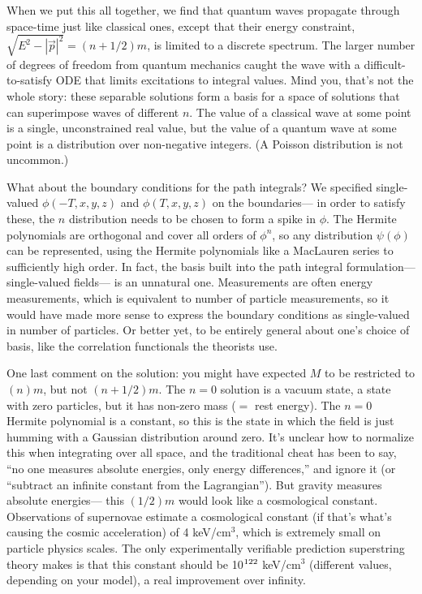 \documentclass[12pt]{article}
\begin{document}
When we put this all together, we find that quantum waves propagate
through space-time just like classical ones, except that their energy
constraint, $\sqrt{E^2 - |\vec{p}|^2} = (n + 1/2) m$, is limited to a
discrete spectrum.  The larger number of degrees of freedom from
quantum mechanics caught the wave with a difficult-to-satisfy ODE that
limits excitations to integral values.  Mind you, that's not the whole
story: these separable solutions form a basis for a space of solutions
that can superimpose waves of different $n$.  The value of a classical
wave at some point is a single, unconstrained real value, but the
value of a quantum wave at some point is a distribution over
non-negative integers.  (A Poisson distribution is not uncommon.)

What about the boundary conditions for the path integrals?  We
specified single-valued $\phi(-T, x, y, z)$ and $\phi(T, x, y, z)$ on
the boundaries--- in order to satisfy these, the $n$ distribution
needs to be chosen to form a spike in $\phi$.  The Hermite polynomials
are orthogonal and cover all orders of $\phi^n$, so any distribution
$\psi(\phi)$ can be represented, using the Hermite polynomials like a
MacLauren series to sufficiently high order.  In fact, the basis built
into the path integral formulation--- single-valued fields--- is an
unnatural one.  Measurements are often energy measurements, which is
equivalent to number of particle measurements, so it would have made
more sense to express the boundary conditions as single-valued in
number of particles.  Or better yet, to be entirely general about
one's choice of basis, like the correlation functionals the theorists
use.

One last comment on the solution: you might have expected $M$ to be
restricted to $(n)m$, but not $(n + 1/2)m$.  The $n = 0$ solution is a
vacuum state, a state with zero particles, but it has non-zero mass
($=$ rest energy).  The $n=0$ Hermite polynomial is a constant, so
this is the state in which the field is just humming with a Gaussian
distribution around zero.  It's unclear how to normalize this when
integrating over all space, and the traditional cheat has been to say,
``no one measures absolute energies, only energy differences,'' and
ignore it (or ``subtract an infinite constant from the Lagrangian'').
But gravity measures absolute energies--- this $(1/2) m$ would look
like a cosmological constant.  Observations of supernovae estimate a
cosmological constant (if that's what's causing the cosmic
acceleration) of 4 keV/cm$^3$, which is extremely small on particle
physics scales.  The only experimentally verifiable prediction
superstring theory makes is that this constant should be
10$^{\mbox{\scriptsize 122}}$ keV/cm$^3$ (different values, depending
on your model), a real improvement over infinity.
\end{document}
